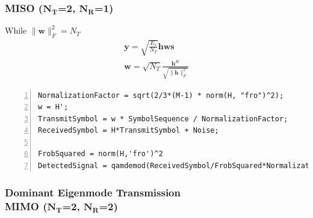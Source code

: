 \documentclass{article}
\begin{document}
\subsubsection[MISO ($N_T$=2, $N_R$=1)]{MISO ($\boldsymbol{N_T}$=2, $\boldsymbol{N_R}$=1)}
While $\lVert \boldsymbol{w} \rVert_F^2=N_T$
\begin{gather}
\boldsymbol{y}=\sqrt{\frac{E_s}{N_T}}\boldsymbol{hws}\\
\boldsymbol{w} = \sqrt{N_T} \frac{\boldsymbol{h}^H}{\sqrt{\lVert \boldsymbol{h} \rVert_F^2}}
\end{gather}
\begin{lstlisting}[style=Matlab-editor, frame=single, numbers=left,]
NormalizationFactor = sqrt(2/3*(M-1) * norm(H, "fro")^2);
w = H';
TransmitSymbol = w * SymbolSequence / NormalizationFactor;
ReceivedSymbol = H*TransmitSymbol + Noise;

FrobSquared = norm(H,'fro')^2
DetectedSignal = qamdemod(ReceivedSymbol/FrobSquared*NormalizationFactor, M)
\end{lstlisting}
\subsubsection[MIMO ($N_T$=2, $N_R$=2)]{Dominant Eigenmode Transmission\\MIMO ($\boldsymbol{N_T}$=2, $\boldsymbol{N_R}$=2)}
\end{document}
